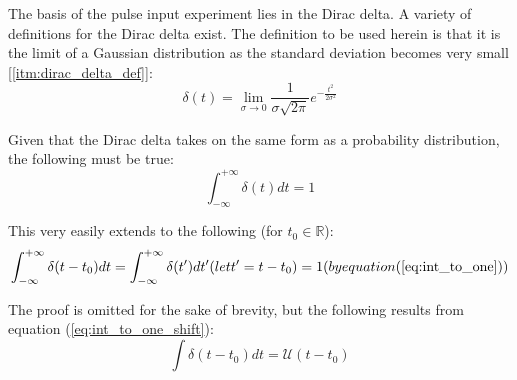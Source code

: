 The basis of the pulse input experiment lies in the Dirac delta. A variety of definitions for the Dirac delta exist. The definition to be used herein is that it is the limit of a Gaussian distribution as the standard deviation becomes very small [\ref{itm:dirac_delta_def}]:
\begin{equation}
	\label{eq:dirac_delta_def}
	\delta(t) = \lim_{\sigma \to 0} \frac{ 1 }{ \sigma \sqrt{ 2 \pi } } e^{ - \frac{ t^2 }{ 2\sigma^2 } }
\end{equation}


Given that the Dirac delta takes on the same form as a probability distribution, the following must be true:
\begin{equation}
	\label{eq:int_to_one}
	\int_{-\infty}^{+\infty}{\delta(t)dt} = 1
\end{equation}

This very easily extends to the following (for $t_0 \in \mathbb{R}$):
\begin{equation}
	\label{eq:int_to_one_shift}
	\int_{-\infty}^{+\infty}{\delta(t-t_0)dt} \\
	= \int_{-\infty}^{+\infty}{\delta(t')dt'} ( let t' = t - t_0 ) \\
	= 1 ( by equation (\ref{eq:int_to_one}) )
\end{equation}

The proof is omitted for the sake of brevity, but the following results from equation (\ref{eq:int_to_one_shift}):
\begin{equation}
	\label{eq:int_of_dirac_is_step}
	\int \delta( t - t_0 )dt = \mathcal{U}( t - t_0 )
\end{equation}

